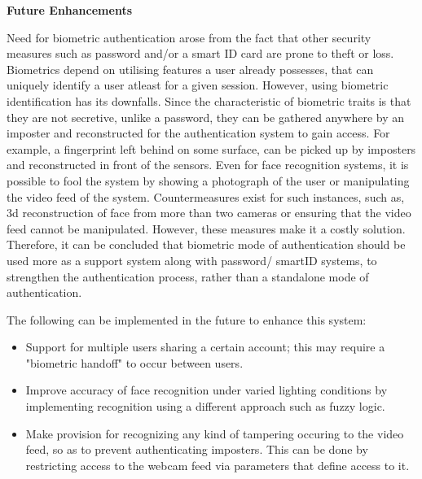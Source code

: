 \documentclass[12pt]{article}			%
\begin{document}

\begin{center}
	{\LARGE \bf Future Enhancements}

\end{center}
\noindent{}Need for biometric authentication arose from the fact that other security measures such as password and/or a smart ID card are prone to theft or loss. Biometrics depend on utilising features a user already possesses, that can uniquely identify a user atleast for a given session. However, using biometric identification has its downfalls. Since the characteristic of biometric traits is that they are not secretive, unlike a password, they can be gathered anywhere by an imposter and reconstructed for the authentication system to gain access. For example, a fingerprint left behind on some surface, can be picked up by imposters and reconstructed in front of the sensors. Even for face recognition systems, it is possible to fool the system by showing a photograph of the user or manipulating the video feed of the system. Countermeasures exist for such instances, such as, 3d reconstruction of face from more than two cameras or ensuring that the video feed cannot be manipulated. However, these measures make it a costly solution. Therefore, it can be concluded that biometric mode of authentication should be used more as a support system along with password/ smartID systems, to strengthen the authentication process, rather than a standalone mode of authentication.   

\noindent{}The following can be implemented in the future to enhance this system:
\begin{itemize}
\item Support for multiple users sharing a certain account; this may require a "biometric handoff" to occur between users.
\item Improve accuracy of face recognition under varied lighting conditions by implementing recognition using a different approach such as fuzzy logic.
\item Make provision for recognizing any kind of tampering occuring to the video feed, so as to prevent authenticating imposters. This can be done by restricting access to the webcam feed via parameters that define access to it.
\end{itemize}
\end{document}
